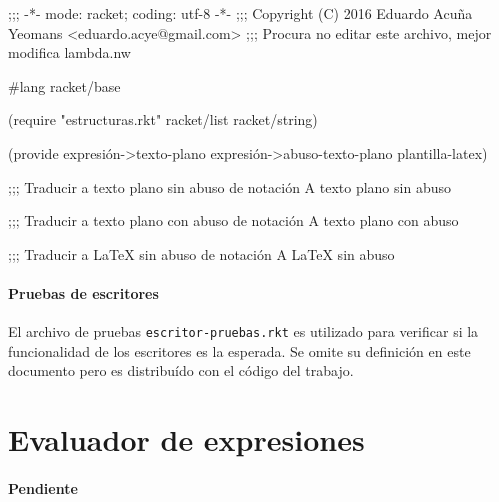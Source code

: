 \nwenddocs{}\endmoddef
;;; -*- mode: racket; coding: utf-8 -*-
;;; Copyright (C) 2016 Eduardo Acuña Yeomans <eduardo.acye@gmail.com>
;;; Procura no editar este archivo, mejor modifica lambda.nw

#lang racket/base

(require "estructuras.rkt"
         racket/list
         racket/string)

(provide expresión->texto-plano
         expresión->abuso-texto-plano
         plantilla-latex)

;;; Traducir a texto plano sin abuso de notación
\LA{}A texto plano sin abuso~{\nwtagstyle{}}\RA{}

;;; Traducir a texto plano con abuso de notación
\LA{}A texto plano con abuso~{\nwtagstyle{}}\RA{}

;;; Traducir a LaTeX sin abuso de notación
\LA{}A LaTeX sin abuso~{\nwtagstyle{}}\RA{}
\nwendcode{}\nwdocspar

\nwenddocs{}\paragraph{Pruebas de escritores} El archivo de pruebas {\tt{}escritor-pruebas.rkt} es utilizado para verificar si la funcionalidad de los escritores es la esperada. Se omite su definición en este documento pero es distribuído con el código del trabajo.


\nwenddocs{}\section*{Evaluador de expresiones}

\paragraph{Pendiente}

